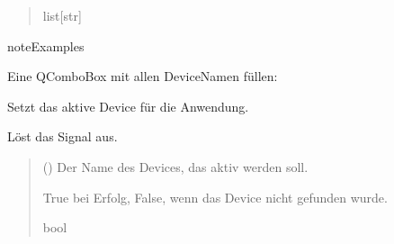 \documentclass[letterpaper,10pt,english]{sphinxmanual}
\begin{document}
\begin{fulllineitems}
\begin{fulllineitems}
\begin{quote}
\begin{description}
\sphinxAtStartPar
list{[}str{]}

\end{description}\end{quote}

\begin{sphinxadmonition}{note}{Examples}

\sphinxAtStartPar
Eine QComboBox mit allen Device\sphinxhyphen{}Namen füllen:

\begin{sphinxVerbatim}[commandchars=\\\{\}]
  
\end{sphinxVerbatim}
\end{sphinxadmonition}

\end{fulllineitems}


\begin{fulllineitems}
\label{\detokenize{modulab/device_manager:modules.device.DeviceManager.DeviceManager.set_active_device}}
\pysigstartsignatures
\pysiglinewithargsret
{}
{}
{}
\pysigstopsignatures
\sphinxAtStartPar
Setzt das aktive Device für die Anwendung.

\sphinxAtStartPar
Löst das \sphinxhyphen{}Signal aus.
\begin{quote}\begin{description}
\sphinxAtStartPar
{} () \textendash{} Der Name des Devices, das aktiv werden soll.

\sphinxAtStartPar
True bei Erfolg, False, wenn das Device nicht gefunden wurde.

\sphinxAtStartPar
bool

\end{description}\end{quote}


\end{fulllineitems}
\end{fulllineitems}
\end{document}
